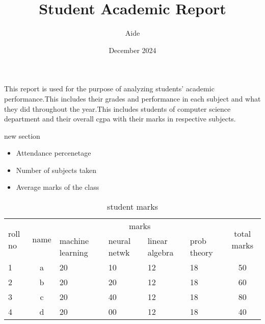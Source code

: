 \documentclass{article}
\title{\textbf{Student Academic Report}}
\author{Aide}
\date{December 2024}
\begin{document}
\maketitle
\noindent
This report is used for the purpose of analyzing students' academic performance.This includes their grades and performance in each subject and what they did throughout the year.This includes students of computer science department and their overall cgpa with their marks in respective subjects.
\begin{section}{new section}
    \begin{itemize}
        \item Attendance percenetage
        \item Number of subjects taken
        \item Average marks of the class
    \end{itemize}
    \begin{table}[h]
    \centering
        \caption{student marks}
        \begin{tabular}{|p{1cm}|c|p{1.9cm}|p{1.9cm}|p{1.9cm}|p{1.9cm}|c|}
            \hline
            \multirow{2}{*}{roll no} & \multirow{2}{*}{name} & \multicolumn{4}{c|}{marks} & \multirow{2}{*}{total marks}            \\
            \cline{3-6}
             & & machine learning & neural netwk & linear algebra & prob theory & \\
             \hline
             1 & a & 20 &10 & 12 & 18 & 50 \\
             \hline
             2 & b & 20 &20 & 12 & 18 & 60 \\
             \hline
             3 & c & 20 &40 & 12 & 18 & 80 \\
             \hline
             4 & d & 20 &00 & 12 & 18 & 40 \\
             \hline
        \end{tabular}
    \end{table}
\end{section}
    
\end{document}
